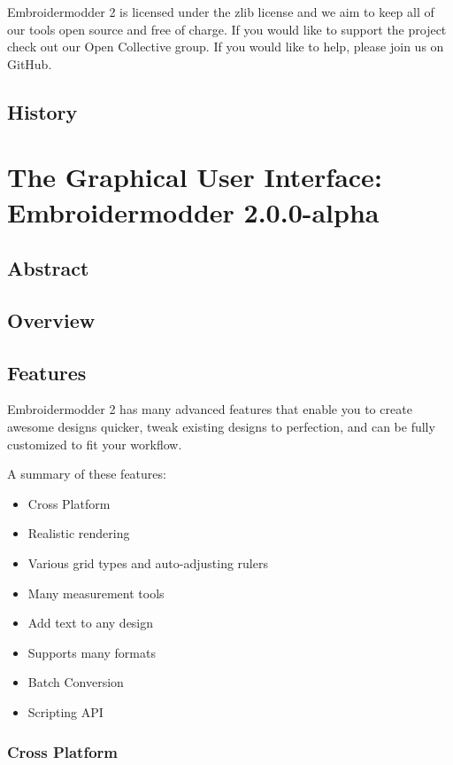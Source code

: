 \documentclass[a4paper, 11pt]{report}
\newcommand{\emversion}{2.0.0-alpha}
\begin{document}
Embroidermodder 2 is licensed under the zlib license and we aim to keep all of our tools open source and free of charge. If you would like to support the project check out our Open Collective group. If you would like to help, please join us on GitHub.

\section{History}

\chapter{The Graphical User Interface: Embroidermodder \emversion}

\section{Abstract}

\section{Overview}

\section{Features}

Embroidermodder 2 has many advanced features that enable you to create awesome designs quicker, tweak existing designs to perfection, and can be fully customized to fit your workflow.

A summary of these features:

\begin{itemize}
\item Cross Platform
\item Realistic rendering
\item Various grid types and auto-adjusting rulers
\item Many measurement tools
\item Add text to any design
\item Supports many formats
\item Batch Conversion
\item Scripting API
\end{itemize}

\subsection{Cross Platform}
\end{document}
